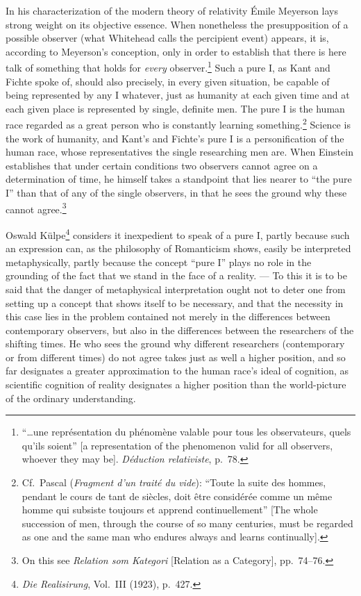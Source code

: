 \documentclass[12pt]{book}
\newcommand{\opage}[1]{\marginnote{\footnotesize\textit{[#1]}}}
\begin{document}
In his characterization of the modern theory of relativity Émile Meyerson lays strong weight on its
objective essence. When nonetheless the presupposition of a possible observer (what Whitehead calls
the percipient event) appears, it is, according to Meyerson's conception, only in order to establish
that there is here talk of something that holds for \textit{every} observer.\footnote{``\ldots une
représentation du phénomène valable pour tous les observateurs, quels qu'ils soient'' [a
representation of the phenomenon valid for all observers, whoever they may be]. \textit{Déduction
relativiste}, p.\ 78.} Such a pure I, as Kant and Fichte spoke of, should also precisely, in every
given situation, be capable of being represented by any I whatever, just as humanity at each given
time and at each given place is represented by single, definite men. The pure I is the human race
regarded as a great person who is constantly learning something.\footnote{Cf.\ Pascal
(\textit{Fragment d'un traité du vide}): ``Toute la suite des hommes, pendant le cours de tant de
siècles, doit être considérée comme un même homme qui subsiste toujours et apprend continuellement''
[The whole succession of men, through the course of so many centuries, must be regarded as one and the
same man who endures always and learns continually].} Science is the work of humanity, and \opage{19}Kant's and
Fichte's pure I is a personification of the human race, whose representatives the single researching
men are. When Einstein establishes that under certain conditions two observers cannot agree on a
determination of time, he himself takes a standpoint that lies nearer to ``the pure I'' than that of
any of the single observers, in that he sees the ground why these cannot agree.\footnote{On this see
\textit{Relation som Kategori} [Relation as a Category], pp.\ 74--76.}

Oswald Külpe\footnote{\textit{Die Realisirung}, Vol.\ III (1923), p.\ 427.} considers it inexpedient
to speak of a pure I, partly because such an expression can, as the philosophy of Romanticism shows,
easily be interpreted metaphysically, partly because the concept ``pure I'' plays no role in the
grounding of the fact that we stand in the face of a reality. --- To this it is to be said that the
danger of metaphysical interpretation ought not to deter one from setting up a concept that shows
itself to be necessary, and that the necessity in this case lies in the problem contained not merely
in the differences between contemporary observers, but also in the differences between the researchers
of the shifting times. He who sees the ground why different researchers (contemporary or from
different times) do not agree takes just as well a higher position, and so far designates a greater
approximation to the human race's ideal of cognition, as scientific cognition of reality designates a
higher position than the world-picture of the ordinary understanding.
\end{document}
